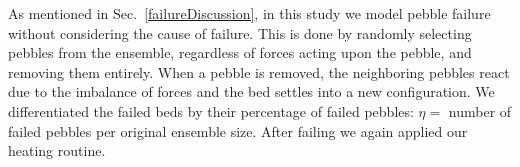 As mentioned in Sec.~\ref{failureDiscussion}, in this study we model pebble failure without considering the cause of failure. This is done by randomly selecting pebbles from the ensemble, regardless of forces acting upon the pebble, and removing them entirely. When a pebble is removed, the neighboring pebbles react due to the imbalance of forces and the bed settles into a new configuration. We differentiated the failed beds by their percentage of failed pebbles: $\eta = $ number of failed pebbles per original ensemble size. After failing we again applied our heating routine.